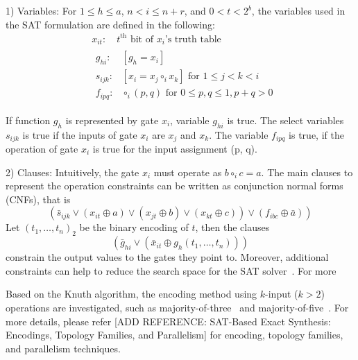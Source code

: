 \documentclass[conference,letterpaper]{IEEEtran}
\begin{document}
1) Variables: For $1 \leq h \leq a$, $n<i \leq n+r$, and $0<t<2^{b}$, the variables used in the SAT formulation are defined in the following:
\begin{equation}
\begin{aligned}
&x_{i t}: \quad t^{\mathrm{th}} \text { bit of } x_{i} \text{'s truth table }\\
&\begin{aligned}
g_{h i}: &\left[g_{h}=x_{i}\right] \\
s_{i j k}: &\left[x_{i}=x_{j} \circ_{i} x_{k}\right] \text { for } 1 \leq j<k<i \\
f_{i p q}: & \circ_{i}(p, q) \text { for } 0 \leq p, q \leq 1, p+q>0
\end{aligned}
\end{aligned}
\end{equation}

If function $g_{h}$ is represented by gate $x_{i}$, variable $g_{hi}$ is true. The select variables $s_{ijk}$ is true if the inputs of gate $x_{i}$ are $x_{j}$ and $x_{k}$. The variable $f_{ipq}$ is true, if the operation of gate $x_{i}$ is true for the input assignment (p, q).

2) Clauses: Intuitively, the gate $x_{i}$ must operate as $b \circ_{i} c=a$.  The main clauses to represent the operation constraints can be written as conjunction normal forms (CNFs), that is
\begin{equation}
\left.\left(\bar{s}_{i j k} \vee\left(x_{i t} \oplus a\right) \vee\left(x_{j t} \oplus b\right) \vee\left(x_{k t} \oplus c\right)\right) \vee\left(f_{i b c} \oplus \bar{a}\right)\right)
\end{equation}
Let $\left(t_{1}, \ldots, t_{n}\right)_{2}$ be the binary encoding of $t$, then the clauses
\begin{equation}
\left(\bar{g}_{h i} \vee\left(\bar{x}_{i t} \oplus g_{h}\left(t_{1}, \ldots, t_{n}\right)\right)\right)
\end{equation}
constrain the output values to the gates they point to. Moreover, additional constraints can help to reduce the search space for the SAT solver~\cite{4}. For more 

Based on the Knuth algorithm, the encoding method using $k$-input ($k > 2$) operations are investigated, such as majority-of-three~\cite{6} and majority-of-five~\cite{3}. For more details, please refer {\color{red} [ADD REFERENCE: SAT-Based Exact Synthesis: Encodings, Topology Families, and Parallelism]} for encoding, topology families, and parallelism techniques.
\end{document}
